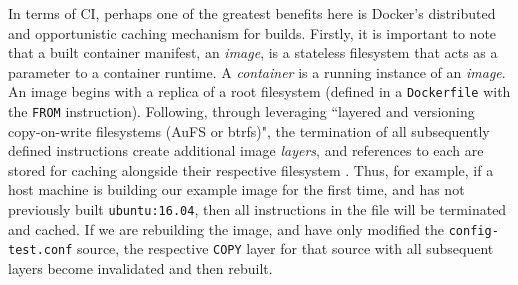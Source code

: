 \documentclass[journal]{IEEEtran}
\begin{document}
\par
In terms of CI, perhaps one of the greatest benefits here is 
Docker's distributed and opportunistic caching mechanism for builds.
Firstly, it is important to note that a built container manifest, an \textit{image}, is a stateless filesystem that acts
as a parameter to a container runtime. A \textit{container} is a running instance of an \textit{image}.
An image begins with a replica of a root filesystem (defined in a \texttt{Dockerfile} with the \texttt{FROM} instruction).
Following, through leveraging ``layered and versioning
copy-on-write filesystems (AuFS or btrfs)", the termination of
all subsequently defined instructions create additional image \textit{layers}, and references to each are
stored for caching alongside their respective filesystem \citep{Arndt}. Thus, for example,
if a host machine is building our example image for the first time, and has not previously
built  \texttt{ubuntu:16.04}, then all instructions in the file will be terminated and cached.
If we are rebuilding the image, and have only modified the \texttt{config-test.conf} source, 
the respective \texttt{COPY} layer for that source with all subsequent layers become invalidated and then rebuilt.
\end{document}
